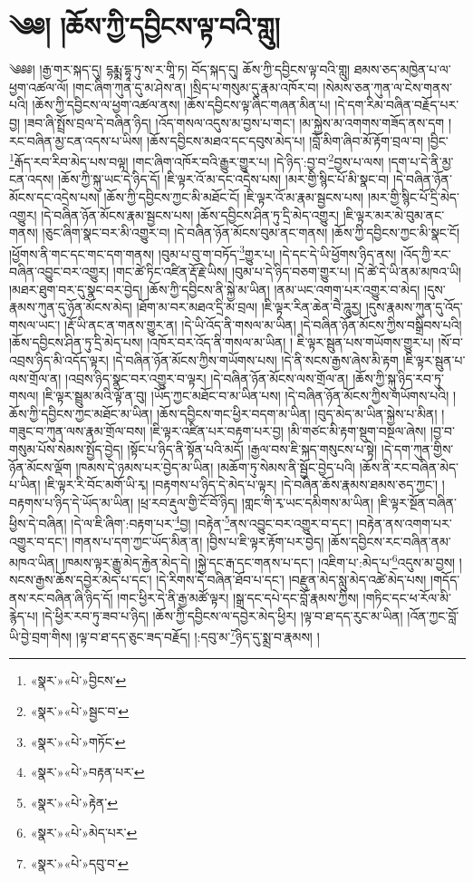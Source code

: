 \chapter{༄༅། །ཆོས་ཀྱི་དབྱིངས་ལྟ་བའི་གླུ།}༄༅༅། །རྒྱ་གར་སྐད་དུ། དྷརྨྨ་དྷཱ་ཏུ་ས་ར་གཱི་ཏ། བོད་སྐད་དུ། ཆོས་ཀྱི་དབྱིངས་ལྟ་བའི་གླུ། ཐམས་ཅད་མཁྱེན་པ་ལ་ཕྱག་འཚལ་ལོ། །གང་ཞིག་ཀུན་དུ་མ་ཤེས་ན། །སྲིད་པ་གསུམ་དུ་རྣམ་འཁོར་བ། །སེམས་ཅན་ཀུན་ལ་ངེས་གནས་པའི། །ཆོས་ཀྱི་དབྱིངས་ལ་ཕྱག་འཚལ་ནས། །ཆོས་དབྱིངས་ལྟ་ཞིང་གཞན་མིན་པ། །དེ་དག་རིམ་བཞིན་བརྗོད་པར་བྱ། །ཟབ་ཞི་སྤྲོས་བྲལ་དེ་བཞིན་ཉིད། །འོད་གསལ་འདུས་མ་བྱས་པ་གང་། །མ་སྐྱེས་མ་འགགས་གཟོད་ནས་དག །རང་བཞིན་མྱ་ངན་འདས་པ་ཡིས། །ཆོས་དབྱིངས་མཐའ་དང་དབུས་མེད་པ། །བློ་མིག་ཞིབ་མོ་རྟོག་བྲལ་བ། །བྱིང་\footnote{«སྣར་»«པེ་»བྱིངས་}རྒོད་རབ་རིབ་མེད་པས་བལྟ། །གང་ཞིག་འཁོར་བའི་རྒྱུར་གྱུར་པ། །དེ་ཉིད་:བྱ་བ་\footnote{«སྣར་»«པེ་»སྦྱང་བ་}བྱས་པ་ལས། །དག་པ་དེ་ནི་མྱ་ངན་འདས། །ཆོས་ཀྱི་སྐུ་ཡང་དེ་ཉིད་དོ། །ཇི་ལྟར་འོ་མ་དང་འདྲེས་པས། །མར་གྱི་སྙིང་པོ་མི་སྣང་བ། །དེ་བཞིན་ཉོན་མོངས་དང་འདྲེས་པས། །ཆོས་ཀྱི་དབྱིངས་ཀྱང་མི་མཐོང་ངོ། །ཇི་ལྟར་འོ་མ་རྣམ་སྦྱངས་པས། །མར་གྱི་སྙིང་པོ་དྲི་མེད་འགྱུར། །དེ་བཞིན་ཉོན་མོངས་རྣམ་སྦྱངས་པས། །ཆོས་དབྱིངས་ཤིན་ཏུ་དྲི་མེད་འགྱུར། །ཇི་ལྟར་མར་མེ་བུམ་ནང་གནས། །ཅུང་ཞིག་སྣང་བར་མི་འགྱུར་བ། །དེ་བཞིན་ཉོན་མོངས་བུམ་ནང་གནས། །ཆོས་ཀྱི་དབྱིངས་ཀྱང་མི་སྣང་ངོ། །ཕྱོགས་ནི་གང་དང་གང་དག་གནས། །བུམ་པ་བུ་ག་བཏོད་\footnote{«སྣར་»«པེ་»གཏོང་}གྱུར་པ། །དེ་དང་དེ་ཡི་ཕྱོགས་ཉིད་ནས། །འོད་ཀྱི་རང་བཞིན་འབྱུང་བར་འགྱུར། །གང་ཚེ་ཏིང་འཛིན་རྡོ་རྗེ་ཡིས། །བུམ་པ་དེ་ཉིད་བཅག་གྱུར་པ། །དེ་ཚེ་དེ་ཡི་ནམ་མཁའ་ཡི། །མཐར་ཐུག་བར་དུ་སྣང་བར་བྱེད། །ཆོས་ཀྱི་དབྱིངས་ནི་སྐྱེ་མ་ཡིན། །ནམ་ཡང་འགག་པར་འགྱུར་བ་མེད། །དུས་རྣམས་ཀུན་དུ་ཉོན་མོངས་མེད། །ཐོག་མ་བར་མཐའ་དྲི་མ་བྲལ། །ཇི་ལྟར་རིན་ཆེན་བཻ་ཌཱུརྱ། །དུས་རྣམས་ཀུན་དུ་འོད་གསལ་ཡང་། །རྡོ་ཡི་ནང་ན་གནས་གྱུར་ན། །དེ་ཡི་འོད་ནི་གསལ་མ་ཡིན། །དེ་བཞིན་ཉོན་མོངས་ཀྱིས་བསྒྲིབས་པའི། །ཆོས་དབྱིངས་ཤིན་ཏུ་དྲི་མེད་པས། །འཁོར་བར་འོད་ནི་གསལ་མ་ཡིན། །
ཇི་ལྟར་སྦུན་པས་གཡོགས་གྱུར་པ། །སོ་བ་འབྲས་ཉིད་མི་འདོད་ལྟར། །དེ་བཞིན་ཉོན་མོངས་ཀྱིས་གཡོགས་པས། །དེ་ནི་སངས་རྒྱས་ཞེས་མི་རྟག །ཇི་ལྟར་སྦུན་པ་ལས་གྲོལ་ན། །འབྲས་ཉིད་སྣང་བར་འགྱུར་བ་ལྟར། །དེ་བཞིན་ཉོན་མོངས་ལས་གྲོལ་ན། །ཆོས་ཀྱི་སྐུ་ཉིད་རབ་ཏུ་གསལ། །ཇི་ལྟར་སྦྲུམ་མའི་ལྟོ་ན་བུ། །ཡོད་ཀྱང་མཐོང་བ་མ་ཡིན་པས། །དེ་བཞིན་ཉོན་མོངས་ཀྱིས་གཡོགས་པའི། །ཆོས་ཀྱི་དབྱིངས་ཀྱང་མཐོང་མ་ཡིན། །ཆོས་དབྱིངས་གང་ཕྱིར་བདག་མ་ཡིན། །བུད་མེད་མ་ཡིན་སྐྱེས་པ་མིན། །གཟུང་བ་ཀུན་ལས་རྣམ་གྲོལ་བས། །ཇི་ལྟར་འཛིན་པར་བརྟག་པར་བྱ། །མི་གཙང་མི་རྟག་སྡུག་བསྔལ་ཞེས། །བྱ་བ་གསུམ་པོས་སེམས་སྤྱོད་བྱེད། །སྟོང་པ་ཉིད་ནི་སྟོན་པའི་མདོ། །རྒྱལ་བས་ཇི་སྐད་གསུངས་པ་སྟེ། །དེ་དག་ཀུན་གྱིས་ཉོན་མོངས་ལྡོག །ཁམས་དེ་ཉམས་པར་བྱེད་མ་ཡིན། །མཆོག་ཏུ་སེམས་ནི་སྦྱོང་བྱེད་པའི། །ཆོས་ནི་རང་བཞིན་མེད་པ་ཡིན། །ཇི་ལྟར་རི་བོང་མགོ་ཡི་རྭ། །བརྟགས་པ་ཉིད་དེ་མེད་པ་ལྟར། །དེ་བཞིན་ཆོས་རྣམས་ཐམས་ཅད་ཀྱང་། །བརྟགས་པ་ཉིད་དེ་ཡོད་མ་ཡིན། །ཕྲ་རབ་རྡུལ་གྱི་ངོ་བོ་ཉིད། །གླང་གི་རྭ་ཡང་དམིགས་མ་ཡིན། །ཇི་ལྟར་སྔོན་བཞིན་ཕྱིས་དེ་བཞིན། །དེ་ལ་ཇི་ཞིག་:བརྟག་པར་\footnote{«སྣར་»«པེ་»བརྟན་པར་}བྱ། །བརྟེན་\footnote{«སྣར་»«པེ་»རྟེན་}ནས་འབྱུང་བར་འགྱུར་བ་དང་། །བརྟེན་ནས་འགག་པར་འགྱུར་བ་དང་། །གནས་པ་དག་ཀྱང་ཡོད་མིན་ན། །བྱིས་པ་ཇི་ལྟར་རྟོག་པར་བྱེད། །ཆོས་དབྱིངས་རང་བཞིན་ནམ་མཁའ་ཡིན། །ཁམས་ལྟར་རྒྱུ་མེད་རྐྱེན་མེད་དེ། །སྐྱེ་དང་རྒ་དང་གནས་པ་དང་། །འཇིག་པ་:མེད་པ་\footnote{«སྣར་»«པེ་»མེད་པར་}འདུས་མ་བྱས། །སངས་རྒྱས་ཆོས་དབྱེར་མེད་པ་དང་། །དེ་རིགས་དེ་བཞིན་ཐོབ་པ་དང་། །བརྫུན་མེད་སླུ་མེད་འཚེ་མེད་པས། །གདོད་ནས་རང་བཞིན་ཞི་ཉིད་དོ། །གང་ཕྱིར་དེ་ནི་རྒྱ་མཚོ་ལྟར། །སྒྲ་དང་དཔེ་དང་བློ་རྣམས་ཀྱིས། །གཏིང་དང་ཕ་རོལ་མི་རྙེད་པ། །དེ་ཕྱིར་རབ་ཏུ་ཟབ་པ་ཉིད། །ཆོས་ཀྱི་དབྱིངས་ལ་དབྱེར་མེད་ཕྱིར། །ལྟ་བ་ཐ་དད་རུང་མ་ཡིན། །འོན་ཀྱང་བློ་ཡི་བྱེ་བྲག་གིས། །ལྟ་བ་ཐ་དད་ཅུང་ཟད་བརྗོད། །:དབུ་མ་\footnote{«སྣར་»«པེ་»དབུ་བ་}ཉིད་དུ་སྨྲ་བ་རྣམས། །
